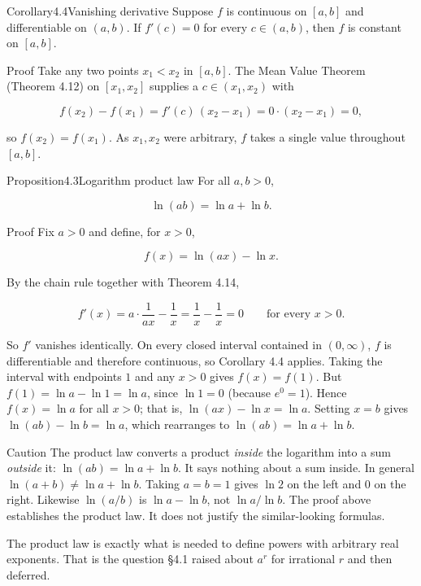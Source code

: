 \documentclass[a4paper,12pt,oneside]{memoir}
\begin{document}
\begin{envcorollary}{Corollary}{4.4}{Vanishing derivative}
Suppose \(f\) is continuous on \([a, b]\) and differentiable on \((a, b)\). If \(f'(c) = 0\) for every \(c \in (a, b)\), then \(f\) is constant on \([a, b]\).
\end{envcorollary}
\begin{envproof}{Proof}{}{}
Take any two points \(x_{1} < x_{2}\) in \([a, b]\). The Mean Value Theorem (Theorem 4.12) on \([x_{1}, x_{2}]\) supplies a \(c \in (x_{1}, x_{2})\) with

\[ f(x_{2}) - f(x_{1}) = f'(c)\,(x_{2} - x_{1}) = 0 \cdot (x_{2} - x_{1}) = 0, \]

so \(f(x_{2}) = f(x_{1})\). As \(x_{1}, x_{2}\) were arbitrary, \(f\) takes a single value throughout \([a, b]\). \qedmark
\end{envproof}
\begin{envproposition}{Proposition}{4.3}{Logarithm product law}
For all \(a, b > 0\),

\[ \ln(ab) = \ln a + \ln b. \]
\end{envproposition}
\begin{envproof}{Proof}{}{}
Fix \(a > 0\) and define, for \(x > 0\),

\[ f(x) = \ln(ax) - \ln x. \]

By the chain rule together with Theorem 4.14,

\[ f'(x) = a \cdot \frac{1}{ax} - \frac{1}{x} = \frac{1}{x} - \frac{1}{x} = 0 \qquad \text{for every } x > 0. \]

So \(f'\) vanishes identically. On every closed interval contained in \((0, \infty)\), \(f\) is differentiable and therefore continuous, so Corollary 4.4 applies. Taking the interval with endpoints \(1\) and any \(x > 0\) gives \(f(x) = f(1)\). But \(f(1) = \ln a - \ln 1 = \ln a\), since \(\ln 1 = 0\) (because \(e^{0} = 1\)). Hence \(f(x) = \ln a\) for all \(x > 0\); that is, \(\ln(ax) - \ln x = \ln a\). Setting \(x = b\) gives \(\ln(ab) - \ln b = \ln a\), which rearranges to \(\ln(ab) = \ln a + \ln b\). \qedmark
\end{envproof}
\begin{envcaution}{Caution}{}{}
The product law converts a product \emph{inside} the logarithm into a sum \emph{outside} it: \(\ln(ab) = \ln a + \ln b\). It says nothing about a sum inside. In general \(\ln(a + b) \ne \ln a + \ln b\). Taking \(a = b = 1\) gives \(\ln 2\) on the left and \(0\) on the right. Likewise \(\ln(a/b)\) is \(\ln a - \ln b\), not \(\ln a / \ln b\). The proof above establishes the product law. It does not justify the similar-looking formulas.
\end{envcaution}
The product law is exactly what is needed to define powers with arbitrary real exponents. That is the question §4.1 raised about \(a^{r}\) for irrational \(r\) and then deferred.
\end{document}

